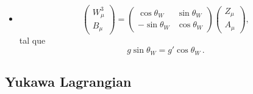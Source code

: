 \begin{frame}
\begin{itemize}
\item 
\begin{equation}
\label{eq:azmix}
  \begin{pmatrix}
    W^3_\mu\\
    B_\mu
  \end{pmatrix}=\begin{pmatrix}
    \cos\theta_W & \sin\theta_W\\
    -\sin\theta_W& \cos\theta_W
  \end{pmatrix}
  \begin{pmatrix}
    Z_\mu\\
    A_\mu
  \end{pmatrix},
\end{equation}
tal que
\begin{equation}
  \label{eq:tw}
  g\sin\theta_W=g'\cos\theta_W\,.
\end{equation}
\end{itemize} %

\end{frame}
\subsection{Yukawa Lagrangian}

